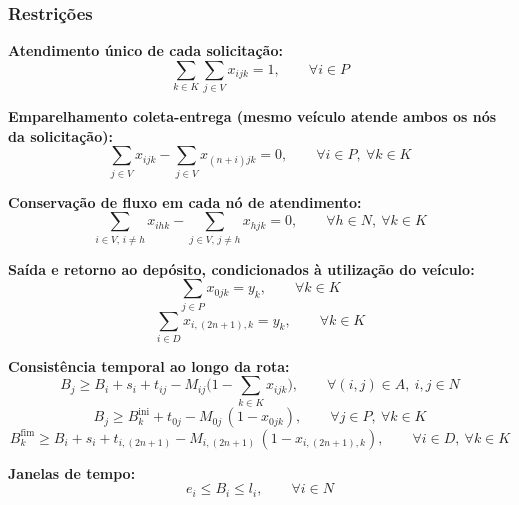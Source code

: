 \documentclass[12pt,a4paper]{article}
\theoremstyle{plain}
\begin{document}
\subsubsection{Restrições}

\textbf{Atendimento único de cada solicitação:}
\begin{equation}
\sum_{k \in K} \sum_{j \in V} x_{ijk} = 1, \qquad \forall i \in P
\end{equation}

\textbf{Emparelhamento coleta-entrega (mesmo veículo atende ambos os nós da solicitação):}
\begin{equation}
\sum_{j \in V} x_{ijk} - \sum_{j \in V} x_{(n+i)jk} = 0, \qquad \forall i \in P,\ \forall k \in K
\end{equation}

\textbf{Conservação de fluxo em cada nó de atendimento:}
\begin{equation}
\sum_{i \in V,\, i \neq h} x_{ihk} - \sum_{j \in V,\, j \neq h} x_{hjk} = 0, \qquad \forall h \in N,\ \forall k \in K
\end{equation}

\textbf{Saída e retorno ao depósito, condicionados à utilização do veículo:}
\begin{equation}
\sum_{j \in P} x_{0jk} = y_k, \qquad \forall k \in K
\label{eq:saida}
\end{equation}
\begin{equation}
\sum_{i \in D} x_{i,(2n+1),k} = y_k, \qquad \forall k \in K
\end{equation}

\textbf{Consistência temporal ao longo da rota:}
\begin{equation}
B_j \geq B_i + s_i + t_{ij} - M_{ij}\Big(1 - \sum_{k \in K} x_{ijk}\Big), \qquad \forall (i,j) \in A,\ i,j \in N
\end{equation}
\begin{equation}
B_j \geq B^{\text{ini}}_k + t_{0j} - M_{0j}\,(1 - x_{0jk}), \qquad \forall j \in P,\ \forall k \in K
\end{equation}
\begin{equation}
B^{\text{fim}}_k \geq B_i + s_i + t_{i,(2n+1)} - M_{i,(2n+1)}\,(1 - x_{i,(2n+1),k}), \qquad \forall i \in D,\ \forall k \in K
\end{equation}

\textbf{Janelas de tempo:}
\begin{equation}
e_i \leq B_i \leq l_i, \qquad \forall i \in N
\label{eq:janelas}
\end{equation}
\end{document}
